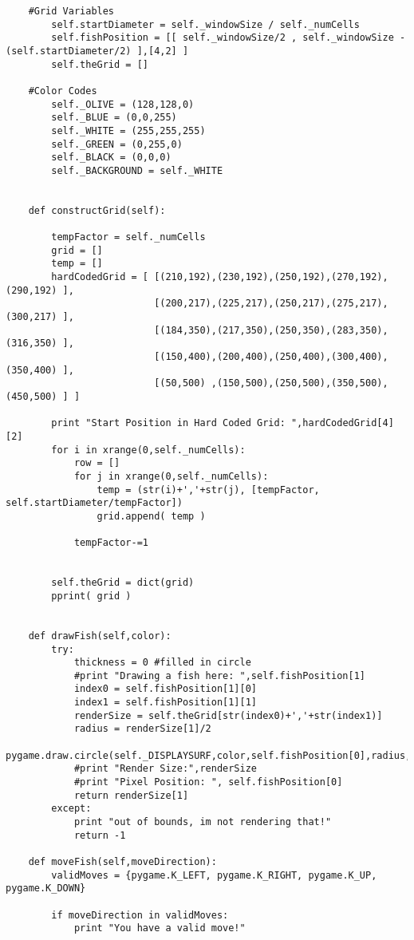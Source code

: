 \begin{verbatim}
    #Grid Variables
        self.startDiameter = self._windowSize / self._numCells
        self.fishPosition = [[ self._windowSize/2 , self._windowSize - (self.startDiameter/2) ],[4,2] ] 
        self.theGrid = []

    #Color Codes
        self._OLIVE = (128,128,0)
        self._BLUE = (0,0,255)
        self._WHITE = (255,255,255)
        self._GREEN = (0,255,0)
        self._BLACK = (0,0,0)
        self._BACKGROUND = self._WHITE


    def constructGrid(self):

        tempFactor = self._numCells
        grid = []
        temp = []
        hardCodedGrid = [ [(210,192),(230,192),(250,192),(270,192),(290,192) ],
                          [(200,217),(225,217),(250,217),(275,217),(300,217) ],
                          [(184,350),(217,350),(250,350),(283,350),(316,350) ],
                          [(150,400),(200,400),(250,400),(300,400),(350,400) ],
                          [(50,500) ,(150,500),(250,500),(350,500),(450,500) ] ] 

        print "Start Position in Hard Coded Grid: ",hardCodedGrid[4][2]
        for i in xrange(0,self._numCells):
            row = []
            for j in xrange(0,self._numCells):
                temp = (str(i)+','+str(j), [tempFactor, self.startDiameter/tempFactor])
                grid.append( temp )
    
            tempFactor-=1
       
 
        self.theGrid = dict(grid)
        pprint( grid )
                
               
    def drawFish(self,color):
        try:
            thickness = 0 #filled in circle
            #print "Drawing a fish here: ",self.fishPosition[1]
            index0 = self.fishPosition[1][0] 
            index1 = self.fishPosition[1][1]
            renderSize = self.theGrid[str(index0)+','+str(index1)]
            radius = renderSize[1]/2
            pygame.draw.circle(self._DISPLAYSURF,color,self.fishPosition[0],radius,thickness)
            #print "Render Size:",renderSize
            #print "Pixel Position: ", self.fishPosition[0]
            return renderSize[1]
        except:
            print "out of bounds, im not rendering that!"
            return -1
    
    def moveFish(self,moveDirection):
        validMoves = {pygame.K_LEFT, pygame.K_RIGHT, pygame.K_UP, pygame.K_DOWN}
    
        if moveDirection in validMoves:
            print "You have a valid move!"    



\end{verbatim}
